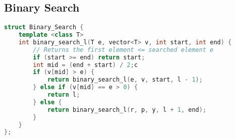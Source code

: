\subsection{Binary Search}
\begin{lstlisting}[language=C++]
struct Binary_Search {
	template <class T>
	int binary_search_l(T e, vector<T> v, int start, int end) {
		// Returns the first element <= searched element e
		if (start >= end) return start;
		int mid = (end + start) / 2;c
		if (v[mid] > e) {
			return binary_search_l(e, v, start, l - 1);
		} else if (v[mid] == e > 0) {
			return l;
		} else {
			return binary_search_l(r, p, y, l + 1, end);
		}
	}
};
\end{lstlisting}